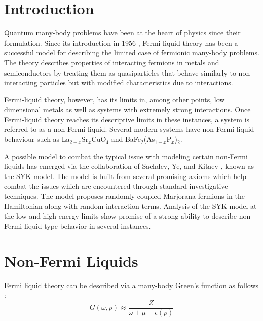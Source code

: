 \documentclass[reprint]{revtex4-2}
\begin{document}
\section{\label{sec:level1}Introduction}
Quantum many-body problems have been at the heart of physics since their formulation. Since its introduction in 1956 \cite{Landau:1958joj}, Fermi-liquid theory has been a successful model for describing the limited case of  fermionic many-body problems. The theory describes properties of interacting fermions in metals and semiconductors by treating them as quasiparticles that behave similarly to non-interacting particles but with modified characteristics due to interactions. 
\par Fermi-liquid theory, however, has its limits in, among other points, low dimensional metals as well as systems with extremely strong interactions. Once Fermi-liquid theory reaches its descriptive limits in these instances, a system is referred to as a non-Fermi liquid. Several modern systems have non-Fermi liquid behaviour such as La$_{2-x}$Sr$_{x}$CuO$_{4}$ \cite{Takagi_1992}and BaFe$_{2}$(As$_{1-x}$P$_{x}$)$_{2}$\cite{Hayes_2016}. 
\par A possible model to combat the typical issue with modeling certain non-Fermi liquids has emerged via the collaboration of Sachdev, Ye, and Kitaev \cite{PhysRevLett.70.3339}\cite{Kitaev_2015}, known as the SYK model. The model is built from several promising axioms which help combat the issues which are encountered through standard investigative techniques. The model proposes randomly coupled Marjorana fermions in the Hamiltonian along with random interaction terms. Analysis of the SYK model at the low and high energy limits show promise of a strong ability to describe non-Fermi liquid type behavior in several instances. 
 

\section{Non-Fermi Liquids}
Fermi liquid theory can be described via a many-body Green's function as follows \cite{Girvin_Yang_2019}:
\begin{equation}
    G(\omega, p) \approx \frac{Z}{\omega + \mu - \epsilon(p)}
\end{equation}
\end{document}
